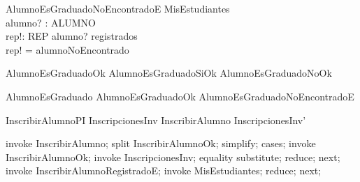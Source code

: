\begin{schema}{AlumnoEsGraduadoNoEncontradoE}
    \Xi MisEstudiantes \\
    alumno? : ALUMNO \\
    rep!: REP
    \where
    alumno? \notin registrados \\
    rep! = alumnoNoEncontrado
\end{schema}

\begin{zed}
    AlumnoEsGraduadoOk  AlumnoEsGraduadoSiOk \lor AlumnoEsGraduadoNoOk
\end{zed}
\begin{zed}
    AlumnoEsGraduado  AlumnoEsGraduadoOk \lor AlumnoEsGraduadoNoEncontradoE
\end{zed}


\begin{theorem}{InscribirAlumnoPI}
    InscripcionesInv \land InscribirAlumno \implies InscripcionesInv'
\end{theorem}

\begin{zproof}[InscribirAlumnoPI]
    invoke InscribirAlumno;
    split InscribirAlumnoOk;
    simplify;
    cases;
    invoke InscribirAlumnoOk;
    invoke InscripcionesInv;
    equality substitute;
    reduce;
    next;
    invoke InscribirAlumnoRegistradoE;
    invoke \Xi MisEstudiantes;
    reduce;
    next;
\end{zproof}

